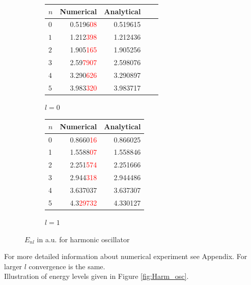 \documentclass[a4paper, 14pt]{article}
\begin{document}
\begin{figure}[h!]
\centering
\begin{subfigure}{.4\textwidth}
\begin{tabular}{lrrrr}
\toprule
{$n$} &     {Numerical} &     {Analytical}   \\
\midrule
$ 0 $&   0.5196\textcolor{red}{08} &    0.519615 \\
$ 1 $ &   1.212\textcolor{red}{398} &    1.212436 \\
$ 2$ &   1.905\textcolor{red}{165} &    1.905256 \\
$ 3 $ &   2.59\textcolor{red}{7907} &    2.598076 \\
$ 4$ &   3.290\textcolor{red}{626} &    3.290897 \\
$ 5 $ &   3.983\textcolor{red}{320} &    3.983717 \\
\bottomrule
\end{tabular}
\caption{$l=0$}
\end{subfigure}%
\begin{subfigure}{.45\textwidth}
\begin{tabular}{lrr}
\toprule
{$n$} &  Numerical &  Analytical \\
\midrule
0 &   0.8660\textcolor{red}{16} &    0.866025 \\
1 &   1.5588\textcolor{red}{07} &    1.558846 \\
2 &   2.251\textcolor{red}{574} &    2.251666 \\
3 &   2.944\textcolor{red}{318} &    2.944486 \\
4 &   3.637037 &    3.637307 \\
5 &   4.3\textcolor{red}{29732} &    4.330127 \\
\bottomrule
\end{tabular}
\caption{$l=1$}
\end{subfigure}
\caption{$E_{nl}$ in a.u. for harmonic oscillator }
\label{table:Harm_osc}
\end{figure}
For more detailed information about numerical experiment see Appendix. For larger $l$ convergence is the same. \\
Illustration of energy levels given in  Figure \ref{fig:Harm_osc}.
\end{document}
